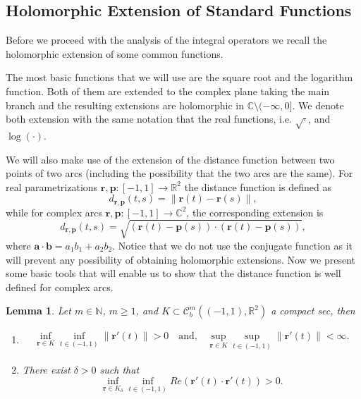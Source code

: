 \documentclass{article}
\newtheorem{lemma}[theorem]{Lemma}
\newcommand{\ba} {\bm a}
\newcommand{\IC}{{\mathbb C}}
\newcommand{\IN}{{\mathbb N}}
\newcommand{\IR}{{\mathbb R}}
\newcommand{\bp}{{\bm p}}
\newcommand{\rgeo}[1]{\mathcal{C}_b^{#1}\left( (-1,1), \IR^2 \right)}
\newcommand{\br}{\bm{r}}
\newcommand{\bb}{\bm{b}}
\begin{document}
\subsection{Holomorphic Extension of Standard Functions}
Before we proceed with the analysis of the integral operators we recall the holomorphic extension of some common functions.

The most basic functions that we will use are the square root and the logarithm function. Both of them are extended to the complex plane taking the main branch and the resulting extensions are holomorphic in $\IC \setminus (-\infty,0]$. We denote both extension with the same notation that the real functions, i.e. $\sqrt{\cdot}$, and $\log{(\cdot)}$.   

We will also make use of the extension of the distance function between two points of two arcs (including the possibility that the two arcs are the same).  For real parametrizations $\br, \bp :[-1,1] \rightarrow \IR^2$ the distance function is defined as 
$$d_{\br,\bp}(t,s) = \| \br(t) - \br(s)\|,$$
while for complex arcs $\br, \bp :[-1,1] \rightarrow \IC^2$, the corresponding extension is 
$$d_{\br,\bp}(t,s) =  \sqrt{(\br(t)-\bp(s))\cdot (\br(t)-\bp(s))},$$
where $\ba \cdot \bb  = a_1 b_1 + a_2 b_2$. Notice that we do not use the conjugate function as it will prevent any possibility of obtaining holomorphic extensions.  Now we present some basic tools that will enable us to show that the distance function is well defined for complex arcs. 
\begin{lemma}
\label{lemma:dwelldef}
Let $m \in \IN$, $m\geq1$, and $K \subset \rgeo{m}$ a compact sec, then 
\begin{enumerate}
\item 
\begin{align*}
\inf_{\br \in K } \inf_{t \in (-1,1)} \| \br'(t) \|>0  \quad \text{and,} \quad  \sup_{\br \in K} \sup_{t \in (-1,1)} \| \br'(t)\| < \infty.
\end{align*}
\item 
There exist $\delta >0 $ such that  
$$ 
\inf_{\br \in K_\delta} \inf_{t \in (-1,1)}Re (\br'(t) \cdot \br'(t)) > 0 .$$
\end{enumerate}
\end{lemma}
\end{document}
